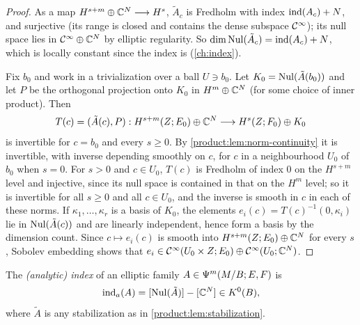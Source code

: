 \begin{proof}
As a map $H^{s+m}\oplus\mathbb{C}^N\longrightarrow H^s$, $\tilde A_c$ is Fredholm with
index $\operatorname{ind}(A_c)+N$, and surjective (its range is closed and contains the dense
subspace $\mathcal{C}^\infty$); its null space lies in $\mathcal{C}^\infty\oplus\mathbb{C}^N$ by elliptic regularity.
So $\dim\operatorname{Nul}(\tilde A_c)=\operatorname{ind}(A_c)+N$, which is locally constant since the index
is (\cref{ch:index}).

Fix $b_0$ and work in a trivialization over a ball $U\ni b_0$. Let
$K_0=\operatorname{Nul}(\tilde A(b_0))$ and let $P$ be the orthogonal projection onto $K_0$
in $H^m\oplus\mathbb{C}^N$ (for some choice of inner product). Then
\begin{equation*}
T(c)=(\tilde A(c),P):H^{s+m}(Z;E_0)\oplus\mathbb{C}^N\longrightarrow H^s(Z;F_0)\oplus K_0
\end{equation*}
is invertible for $c=b_0$ and every $s\ge0$. By \cref{product:lem:norm-continuity}
it is invertible, with inverse depending smoothly on $c$, for $c$ in a
neighbourhood $U_0$ of $b_0$ when $s=0$. For $s>0$ and $c\in U_0$, $T(c)$ is
Fredholm of index $0$ on the $H^{s+m}$ level and injective, since its null space
is contained in that on the $H^m$ level; so it is invertible for all $s\ge0$ and
all $c\in U_0$, and the inverse is smooth in $c$ in each of these norms. If
$\kappa_1,\dots,\kappa_r$ is a basis of $K_0$, the elements
$e_i(c)=T(c)^{-1}(0,\kappa_i)$ lie in $\operatorname{Nul}(\tilde A(c))$ and are linearly
independent, hence form a basis by the dimension count. Since $c\mapsto e_i(c)$
is smooth into $H^{s+m}(Z;E_0)\oplus\mathbb{C}^N$ for every $s$, Sobolev embedding shows
that $e_i\in\mathcal{C}^\infty(U_0\times Z;E_0)\oplus\mathcal{C}^\infty(U_0;\mathbb{C}^N)$.
\end{proof}

\begin{definition}\label{product:def:index-bundle}
The \emph{(analytic) index} of an elliptic family $A\in\Psi^{m}(M/B;E,F)$ is
\begin{equation*}
\operatorname{ind}_a(A)=[\operatorname{Nul}(\tilde A)]-[\mathbb{C}^N]\in K^0(B),
\end{equation*}
where $\tilde A$ is any stabilization as in \cref{product:lem:stabilization}.
\end{definition}

